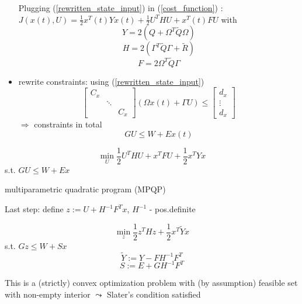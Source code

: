 \begin{itemize}
Plugging (\ref{rewritten_state_input}) in (\ref{cost_function}) : $J(x(t),U) = \frac{1}{2}x^T(t)Yx(t) + \frac{1}{2}U^THU + x^T(t)FU$
with
\begin{equation*}
Y = 2(Q + \Omega^T \tilde{Q} \Omega)
\end{equation*}
\begin{equation*}
H = 2(\Gamma^T\tilde{Q}\Gamma + \tilde{R})
\end{equation*}
\begin{equation*}
F = 2\Omega^T \tilde{Q} \Gamma
\end{equation*}

\item rewrite constraints: using (\ref{rewritten_state_input})
\begin{equation*}
\begin{bmatrix}
    C_x  & \  & \ \\
    \  &\ddots & \\
     \  & \ & C_x     
\end{bmatrix} (\Omega x(t) + \Gamma U) \leq \begin{bmatrix}
   d_x \\
   \vdots \\
   d_x   
\end{bmatrix}
\end{equation*}
$\Rightarrow$ constraints in total
\begin{equation*}
GU \leq W + Ex(t)
\end{equation*}
\end{itemize}

\begin{equation}\label{standard_problem}
\min_U \frac{1}{2} U^THU + x^TFU + \frac{1}{2}x^TYx
\end{equation}
s.t. $GU \leq W + Ex$

multiparametric quadratic program (MPQP)

Last step: define $z:=U+H^{-1}F^Tx$, $H^{-1}$ - pos.definite 

\begin{equation}\label{rewritten_problem}
\min_{z} \frac{1}{2}z^THz + \frac{1}{2}x^T \tilde{Y}x
\end{equation}
s.t. $Gz \leq W + Sx$
\begin{equation*}
\tilde{Y} := Y - FH^{-1}F^T
\end{equation*}
\begin{equation*}
S := E + GH^{-1}F^T
\end{equation*}

This is a (strictly) convex optimization problem with (by assumption) feasible set with non-empty interior $\leadsto$ Slater's condition satisfied

